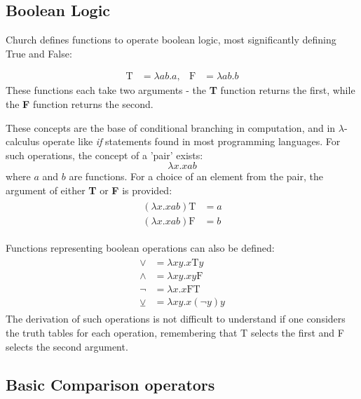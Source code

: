 \documentclass[Master.tex]{subfiles}
\begin{document}
\subsection{Boolean Logic}

Church defines functions to operate boolean logic, most significantly defining True and False:
    
\begin{equation*}
\begin{aligned}
\bm{\mathrm{T}} &= \lambda ab.a,
  & %
\bm{\mathrm{F}} &= \lambda ab.b
\end{aligned}
\end{equation*}
These functions each take two arguments - the \textbf{T} function returns the first, while the \textbf{F} function returns the second.

These concepts are the base of conditional branching in computation, and in $\lambda$-calculus operate like \textit{if} statements found in most programming languages. For such operations, the concept of a 'pair' exists:
\begin{equation*}
\lambda x.xab
\end{equation*}
where $a$ and $b$ are functions. For a choice of an element from the pair, the argument of either \textbf{T} or \textbf{F} is provided:
\begin{gather*}
\begin{aligned}
(\lambda x.xab)\bm{\mathrm{T}} &= a\\
(\lambda x.xab)\bm{\mathrm{F}} &= b
\end{aligned}
\end{gather*}

Functions representing boolean operations can also be defined:
\begin{gather*}
\begin{aligned}
\vee &= \lambda xy.x\bm{\mathrm{T}}y\\
\wedge &= \lambda xy.xy\bm{\mathrm{F}}\\
\lnot &= \lambda x.x\bm{\mathrm{FT}} \\
\veebar &= \lambda xy.x(\lnot y)y
\end{aligned}
\end{gather*}
The derivation of such operations is not difficult to understand if one considers the truth tables for each operation, remembering that T selects the first and F selects the second argument.

\subsection{Basic Comparison operators}
\end{document}
